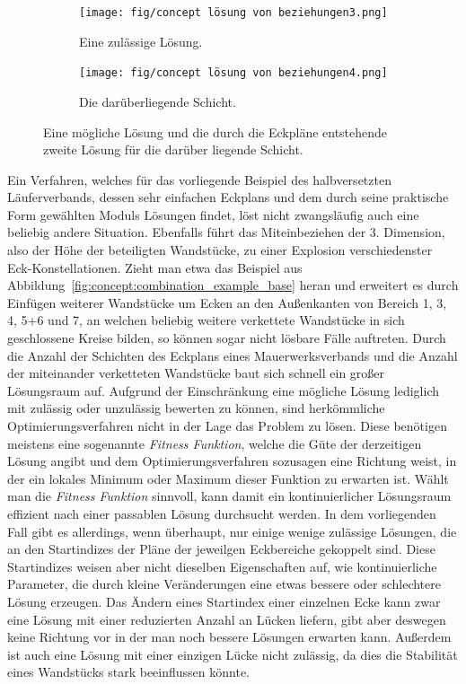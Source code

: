 \begin{figure}[ht!]
    \centering
    \begin{subfigure}[b]{0.4\columnwidth}
      \texttt{[image: fig/concept lösung von beziehungen3.png]}
      \caption{Eine zulässige Lösung.}
      \label{fig:concept:loesen_von_beziehungen3}
    \end{subfigure}
    \hfil
    \begin{subfigure}[b]{0.4\columnwidth}
      \texttt{[image: fig/concept lösung von beziehungen4.png]}
      \caption{Die darüberliegende Schicht.}
      \label{fig:concept:loesen_von_beziehungen4}
    \end{subfigure}
  \caption{Eine mögliche Lösung und die durch die Eckpläne entstehende zweite Lösung für die darüber liegende Schicht.}
  \label{fig:concept:loesen_von_beziehungen3und4}
\end{figure}

Ein Verfahren, welches für das vorliegende Beispiel des halbversetzten Läuferverbands, dessen sehr einfachen Eckplans und dem durch seine praktische Form gewählten Moduls Lösungen findet, löst nicht zwangsläufig auch eine beliebig andere Situation.
Ebenfalls führt das Miteinbeziehen der 3. Dimension, also der Höhe der beteiligten Wandstücke, zu einer Explosion verschiedenster Eck-Konstellationen.
Zieht man etwa das Beispiel aus Abbildung~\ref{fig:concept:combination_example_base} heran und erweitert es durch Einfügen weiterer Wandstücke um Ecken an den Außenkanten von Bereich 1, 3, 4, 5+6 und 7, an welchen beliebig weitere verkettete Wandstücke in sich geschlossene Kreise bilden, so können sogar nicht lösbare Fälle auftreten.
Durch die Anzahl der Schichten des Eckplans eines Mauerwerksverbands und die Anzahl der miteinander verketteten Wandstücke baut sich schnell ein großer Lösungsraum auf.
Aufgrund der Einschränkung eine mögliche Lösung lediglich mit zulässig oder unzulässig bewerten zu können, sind herkömmliche Optimierungsverfahren nicht in der Lage das Problem zu lösen.
Diese benötigen meistens eine sogenannte \textit{Fitness Funktion}, welche die Güte der derzeitigen Lösung angibt und dem Optimierungsverfahren sozusagen eine Richtung weist, in der ein lokales Minimum oder Maximum dieser Funktion zu erwarten ist.
Wählt man die \textit{Fitness Funktion} sinnvoll, kann damit ein kontinuierlicher Lösungsraum effizient nach einer passablen Lösung durchsucht werden.
In dem vorliegenden Fall gibt es allerdings, wenn überhaupt, nur einige wenige zulässige Lösungen, die an den Startindizes der Pläne der jeweilgen Eckbereiche gekoppelt sind.
Diese Startindizes weisen aber nicht dieselben Eigenschaften auf, wie kontinuierliche Parameter, die durch kleine Veränderungen eine etwas bessere oder schlechtere Lösung erzeugen.
Das Ändern eines Startindex einer einzelnen Ecke kann zwar eine Lösung mit einer reduzierten Anzahl an Lücken liefern, gibt aber deswegen keine Richtung vor in der man noch bessere Lösungen erwarten kann.
Außerdem ist auch eine Lösung mit einer einzigen Lücke nicht zulässig, da dies die Stabilität eines Wandstücks stark beeinflussen könnte.

